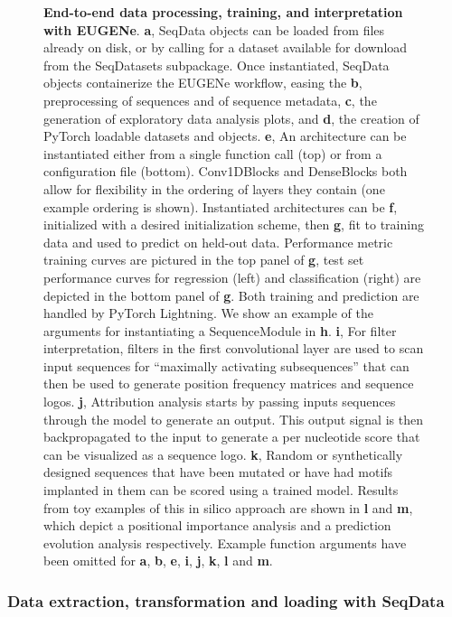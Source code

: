 \begin{figure}[p]
    \caption[End-to-end data processing with EUGENe]{\textbf{End-to-end data processing, training, and interpretation with EUGENe}. \textbf{a}, SeqData objects can be loaded from files already on disk, or by calling for a dataset available for download from the SeqDatasets subpackage. Once instantiated, SeqData objects containerize the EUGENe workflow, easing the \textbf{b}, preprocessing of sequences and of sequence metadata, \textbf{c}, the generation of exploratory data analysis plots, and \textbf{d}, the creation of PyTorch loadable datasets and objects. \textbf{e}, An architecture can be instantiated either from a single function call (top) or from a configuration file (bottom). Conv1DBlocks and DenseBlocks both allow for flexibility in the ordering of layers they contain (one example ordering is shown). Instantiated architectures can be \textbf{f}, initialized with a desired initialization scheme, then \textbf{g}, fit to training data and used to predict on held-out data. Performance metric training curves are pictured in the top panel of \textbf{g}, test set performance curves for regression (left) and classification (right) are depicted in the bottom panel of \textbf{g}. Both training and prediction are handled by PyTorch Lightning. We show an example of the arguments for instantiating a SequenceModule in \textbf{h}. \textbf{i}, For filter interpretation, filters in the first convolutional layer are used to scan input sequences for “maximally activating subsequences” that can then be used to generate position frequency matrices and sequence logos. \textbf{j}, Attribution analysis starts by passing inputs sequences through the model to generate an output. This output signal is then backpropagated to the input to generate a per nucleotide score that can be visualized as a sequence logo. \textbf{k}, Random or synthetically designed sequences that have been mutated or have had motifs implanted in them can be scored using a trained model. Results from toy examples of this in silico approach are shown in \textbf{l} and \textbf{m}, which depict a positional importance analysis and a prediction evolution analysis respectively. Example function arguments have been omitted for \textbf{a}, \textbf{b}, \textbf{e}, \textbf{i}, \textbf{j}, \textbf{k}, \textbf{l} and \textbf{m}.}
    \label{fig:5 Figure 5}
\end{figure}

\subsubsection{Data extraction, transformation and loading with SeqData}

